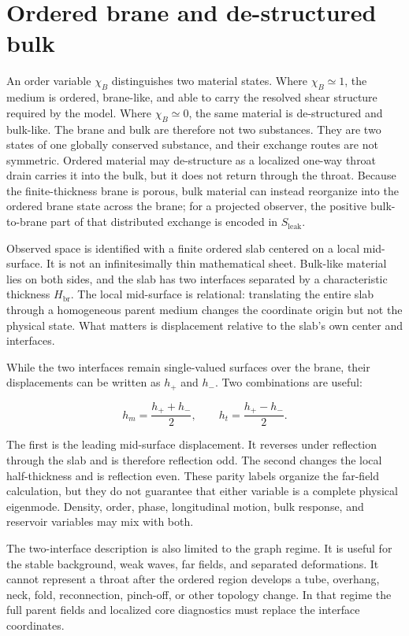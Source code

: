 \section{Ordered brane and de-structured bulk}

An order variable \(\chi_B\) distinguishes two material states. Where
\(\chi_B\simeq1\), the medium is ordered, brane-like, and able to carry the
resolved shear structure required by the model. Where \(\chi_B\simeq0\), the
same material is de-structured and bulk-like. The brane and bulk are therefore
not two substances. They are two states of one globally conserved substance,
and their exchange routes are not symmetric. Ordered material may de-structure
as a localized one-way throat drain carries it into the bulk, but it does not
return through the throat. Because the finite-thickness brane is porous, bulk
material can instead reorganize into the ordered brane state across the brane;
for a projected observer, the positive bulk-to-brane part of that distributed
exchange is encoded in \(S_{\mathrm{leak}}\).

Observed space is identified with a finite ordered slab centered on a local
mid-surface. It is not an infinitesimally thin mathematical sheet. Bulk-like
material lies on both sides, and the slab has two interfaces separated by a
characteristic thickness \(H_{\mathrm{br}}\). The local mid-surface is
relational: translating the entire slab through a homogeneous parent medium
changes the coordinate origin but not the physical state. What matters is
displacement relative to the slab's own center and interfaces.

While the two interfaces remain single-valued surfaces over the brane, their
displacements can be written as \(h_+\) and \(h_-\). Two combinations are useful:

\[
h_m=\frac{h_++h_-}{2},
\qquad
h_t=\frac{h_+-h_-}{2}.
\]

The first is the leading mid-surface displacement. It reverses under reflection
through the slab and is therefore reflection odd. The second changes the local
half-thickness and is reflection even. These parity labels organize the
far-field calculation, but they do not guarantee that either variable is a
complete physical eigenmode. Density, order, phase, longitudinal motion, bulk
response, and reservoir variables may mix with both.

The two-interface description is also limited to the graph regime. It is useful
for the stable background, weak waves, far fields, and separated deformations.
It cannot represent a throat after the ordered region develops a tube, overhang,
neck, fold, reconnection, pinch-off, or other topology change. In that regime
the full parent fields and localized core diagnostics must replace the interface
coordinates.

